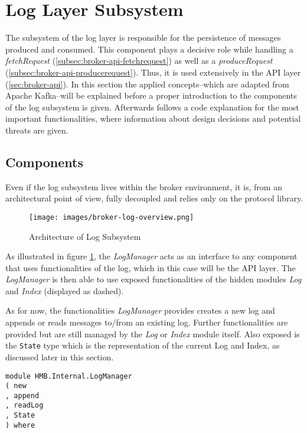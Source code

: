 \newpage
\section{Log Layer Subsystem}
\label{sec:impl-broker-log}

The subsystem of the log layer is responsible for the persistence of messages
produced and consumed. This component plays a decisive role while handling a
\textit{fetchRequest} (\ref{subsec:broker-api-fetchrequest}) as well as a
\textit{produceRequest} (\ref{subsec:broker-api-producerequest}). Thus, it is
used extensively in the API layer (\ref{sec:broker-api}). In this section the
applied concepts--which are adapted from Apache Kafka--will be explained before
a proper introduction to the components of the log subsystem is given.
Afterwards follows a code explanation for the most important functionalities,
where information about design decisions and potential threats are given.

\subsection{Components}

Even if the log subsystem lives within the broker environment, it is, from an
architectural point of view, fully decoupled and relies only on the protocol
library.

\begin{figure}[H]
    \centering
    \texttt{[image: images/broker-log-overview.png]}
    \caption{Architecture of Log Subsystem}
    \label{fig:broker-log-overview}
\end{figure}

As illustrated in figure \ref{fig:broker-log-overview}, the \textit{LogManager}
acts as an interface to any component that uses functionalities of the log,
which in this case will be the API layer. The \textit{LogManager} is then able
to use exposed functionalities of the hidden modules \textit{Log} and
\textit{Index} (displayed as dashed). 

As for now, the functionalities \textit{LogManager} provides creates a new log
and appends or reads messages to/from an existing log. Further functionalities
are provided but are still managed by the \textit{Log} or \textit{Index} module
itself. Also exposed is the \lstinline{State} type which is the representation
of the current Log and Index, as discussed later in this section.

\begin{lstlisting}
module HMB.Internal.LogManager
( new
, append
, readLog
, State
) where
\end{lstlisting}

